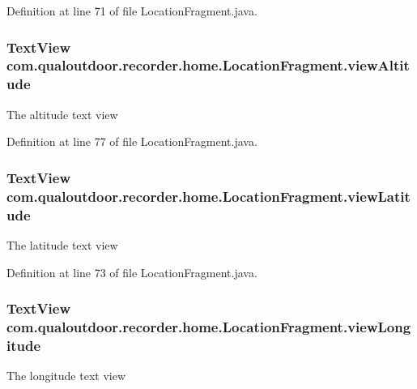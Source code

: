 Definition at line 71 of file Location\-Fragment.\-java.

\hypertarget{classcom_1_1qualoutdoor_1_1recorder_1_1home_1_1LocationFragment_a060e63c443aff5bb0ad7c73cc42e5cd7}{
\subsubsection[{view\-Altitude}]{\setlength{\rightskip}{0pt plus 5cm}Text\-View com.\-qualoutdoor.\-recorder.\-home.\-Location\-Fragment.\-view\-Altitude\hspace{0.3cm}{\ttfamily [private]}}}\label{classcom_1_1qualoutdoor_1_1recorder_1_1home_1_1LocationFragment_a060e63c443aff5bb0ad7c73cc42e5cd7}
The altitude text view 

Definition at line 77 of file Location\-Fragment.\-java.

\hypertarget{classcom_1_1qualoutdoor_1_1recorder_1_1home_1_1LocationFragment_a405f4a71f664401ad6e666067a015459}{
\subsubsection[{view\-Latitude}]{\setlength{\rightskip}{0pt plus 5cm}Text\-View com.\-qualoutdoor.\-recorder.\-home.\-Location\-Fragment.\-view\-Latitude\hspace{0.3cm}{\ttfamily [private]}}}\label{classcom_1_1qualoutdoor_1_1recorder_1_1home_1_1LocationFragment_a405f4a71f664401ad6e666067a015459}
The latitude text view 

Definition at line 73 of file Location\-Fragment.\-java.

\hypertarget{classcom_1_1qualoutdoor_1_1recorder_1_1home_1_1LocationFragment_ad07ba1fe99ac9a6bb2043a75789ccb10}{
\subsubsection[{view\-Longitude}]{\setlength{\rightskip}{0pt plus 5cm}Text\-View com.\-qualoutdoor.\-recorder.\-home.\-Location\-Fragment.\-view\-Longitude\hspace{0.3cm}{\ttfamily [private]}}}\label{classcom_1_1qualoutdoor_1_1recorder_1_1home_1_1LocationFragment_ad07ba1fe99ac9a6bb2043a75789ccb10}
The longitude text view 

